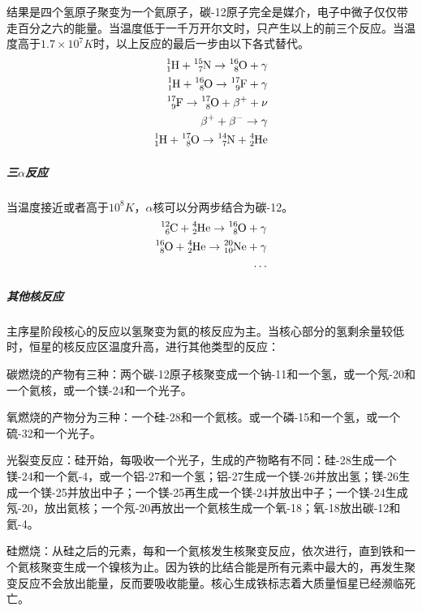 结果是四个氢原子聚变为一个氦原子，碳-12原子完全是媒介，电子中微子仅仅带走百分之六的能量。当温度低于一千万开尔文时，只产生以上的前三个反应。当温度高于$1.7\times 10^7K$时，以上反应的最后一步由以下各式替代。
\begin{equation}
	\begin{aligned}
		\ce{^{1}_{1}H}+\ce{^{15}_{7}N}\rightarrow\ce{^{16}_{8}O}+\gamma\\
		\ce{^{1}_{1}H}+\ce{^{16}_{8}O}\rightarrow\ce{^{17}_{9}F}+\gamma\\
		\ce{^{17}_{9}F}\rightarrow\ce{^{17}_{8}O}+\ce{\beta+}+\nu\\
		\ce{\beta+}+\ce{\beta-}\rightarrow\gamma\\
		\ce{^{1}_{1}H}+\ce{^{17}_{8}O}\rightarrow\ce{^{14}_{7}N}+\ce{^{4}_{2}He}\\
	\end{aligned}
\end{equation}
\subparagraph{三$\alpha$反应}
当温度接近或者高于$10^8K$，$\alpha$核可以分两步结合为碳-12。
\begin{equation}
	\begin{aligned}
		\ce{^{12}_{6}C}+\ce{^{4}_{2}He}\rightarrow\ce{^{16}_{8}O}+\gamma \\
		\ce{^{16}_{8}O}+\ce{^{4}_{2}He}\rightarrow\ce{^{20}_{10}Ne}+\gamma\\
		\dots
	\end{aligned}
\end{equation}
\subparagraph{其他核反应}主序星阶段核心的反应以氢聚变为氦的核反应为主。当核心部分的氢剩余量较低时，恒星的核反应区温度升高，进行其他类型的反应：

碳燃烧的产物有三种：两个碳-12原子核聚变成一个钠-11和一个氢，或一个氖-20和一个氦核，或一个镁-24和一个光子。

氧燃烧的产物分为三种：一个硅-28和一个氦核。或一个磷-15和一个氢，或一个硫-32和一个光子。

光裂变反应：硅开始，每吸收一个光子，生成的产物略有不同：硅-28生成一个镁-24和一个氦-4，或一个铝-27和一个氢；铝-27生成一个镁-26并放出氢；镁-26生成一个镁-25并放出中子；一个镁-25再生成一个镁-24并放出中子；一个镁-24生成氖-20，放出氦核；一个氖-20再放出一个氦核生成一个氧-18；氧-18放出碳-12和氦-4。

硅燃烧：从硅之后的元素，每和一个氦核发生核聚变反应，依次进行，直到铁和一个氦核聚变生成一个镍核为止。因为铁的比结合能是所有元素中最大的，再发生聚变反应不会放出能量，反而要吸收能量。核心生成铁标志着大质量恒星已经濒临死亡。
